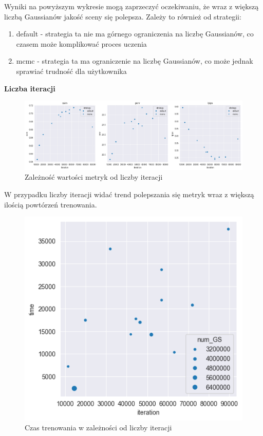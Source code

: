 Wyniki na powyższym wykresie mogą zaprzeczyć oczekiwaniu, że wraz z większą liczbą Gaussianów jakość sceny się polepsza. Zależy to również od strategii:
\begin{enumerate}
    \item default - strategia ta nie ma górnego ograniczenia na liczbę Gaussianów, co czasem może komplikować proces uczenia
    \item mcmc - strategia ta ma ograniczenie na liczbę Gaussianów, co może jednak sprawiać trudność dla użytkownika
\end{enumerate}

\textbf{Liczba iteracji}

\begin{figure}[!h]
    \includegraphics[width=\linewidth]{img/iterations_metrics.png}
    \caption{Zależność wartości metryk od liczby iteracji}
    \label{fig:metrics_2}
\end{figure}

W przypadku liczby iteracji widać trend polepszania się metryk wraz z większą ilością powtórzeń trenowania. 

\begin{figure}[!h]
    \centering
    \includegraphics[width=0.6\linewidth]{img/training_time_iter.png}
    \caption{Czas trenowania w zależności od liczby iteracji}
    \label{fig:metrics_4}
\end{figure}

